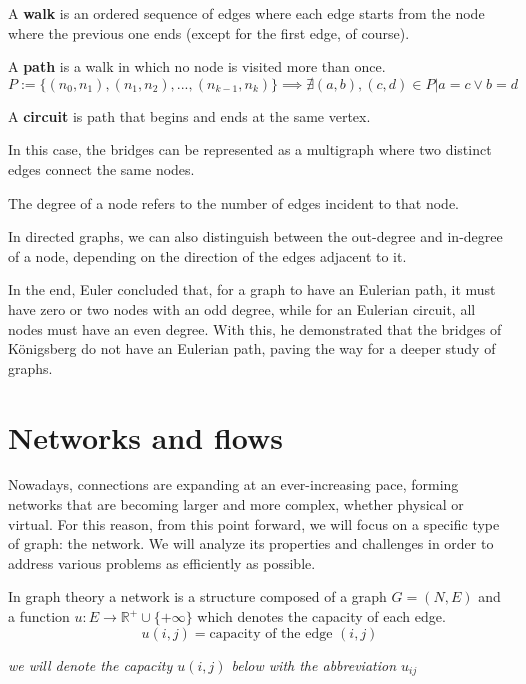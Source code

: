 \begin{definition}
    A \textbf{walk} is an ordered sequence of edges where each edge starts from the node where the previous one ends (except for the first edge, of course).

    A \textbf{path} is a walk in which no node is visited more than once.
    \[P := \{(n_0, n_1),(n_1, n_2), ..., (n_{k-1}, n_k) \}\implies \nexists (a,b), (c,d)\in P | a = c \lor b = d\]
    
    A \textbf{circuit} is path that begins and ends at the same vertex.

\end{definition}

    In this case, the bridges can be represented as a multigraph where two distinct edges connect the same nodes.

\begin{definition}
    The degree of a node refers to the number of edges incident to that node.  
    
    In directed graphs, we can also distinguish between the out-degree and in-degree of a node, depending on the direction of the edges adjacent to it.
\end{definition}

In the end, Euler concluded that, for a graph to have an Eulerian path, it must have zero or two nodes with an odd degree, while for an Eulerian circuit, all nodes must have an even degree. With this, he demonstrated that the bridges of Königsberg do not have an Eulerian path, paving the way for a deeper study of graphs.
\newpage
\section{Networks and flows}
Nowadays, connections are expanding at an ever-increasing pace, forming networks that are becoming larger and more complex, whether physical or virtual. For this reason, from this point forward, we will focus on a specific type of graph: the network. We will analyze its properties and challenges in order to address various problems as efficiently as possible.
\begin{definition}[Network]
    In graph theory a network is a structure composed of a graph $G = (N,E)$ and a function $u: E \rightarrow \mathbb{R}^+\cup \{+\infty\}$ which denotes the capacity of each edge.
    \[u(i,j) = \text{capacity of the edge } (i,j)\]
    \begin{center}
        \textit{we will denote the capacity $u(i,j)$ below with the abbreviation $u_{ij}$}
    \end{center}
\end{definition}

